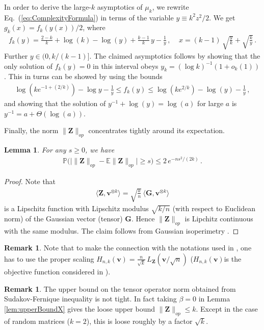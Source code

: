 \documentclass[11pt]{article}
\newtheorem{lemma}[claim]{Lemma}
\theoremstyle{definition}
\newtheorem{remark}[claim]{Remark}
\def\<{\langle}
\def\>{\rangle}
\def\prob{{\mathbb P}}
\def\E{{\mathbb E}} %
\def\bv{\mathbf{v}}
\def\bZ{\mathbf{Z}}
\def\bG{\mathbf{G}}
\def\E{\mathbb{E}}
\begin{document}
In order to derive the large-$k$ asymptotics of $\mu_k$, we
rewrite Eq.~(\ref{eq:ComplexityFormula}) in terms of the variable
$y\equiv k^2z^2/2$. We get $g_k(x) = f_k(y(x))/2$, where
%
\begin{align}
%
f_k(y) =\frac{2-k}{k} +\log(k)- \log (y)+ \frac{k-1}{k}\, y -
\frac{1}{y}\, ,\;\;\;\;
x =  (k-1) \, \sqrt{\frac{y}{k}}+\sqrt{\frac{k}{y}}\, .
%
\end{align}
%
Further $y \in (0, k/(k-1)]$.  The claimed asymptotics follows by
showing that the only solution of $f_k(y) = 0$ in this interval obeys
$y_k = (\log k)^{-1} (1+o_k(1))$. This in turns can be showed by using the
bounds
%
\begin{align}
%
\log(ke^{-1+(2/k)}) -\log y- \frac{1}{y} \le f_k(y) \le \log(ke^{2/k})
-\log(y) -\frac{1}{y}\, ,
%
\end{align}
%
and showing that the solution of $y^{-1}+\log(y) = \log(a)$ for large
$a$ is $y^{-1} = a +\Theta(\log(a))$.

Finally, the norm $\|\bZ\|_{op}$ concentrates tightly around its expectation.
\begin{lemma}
For any $s\ge 0$, we have
%
\begin{align}
%
\prob\big(\big|\|\bZ\|_{op}-\E\|\bZ\|_{op}\big|\ge s\big)\le 2\,
e^{-ns^2/(2k)}\, .
%
\end{align}
\end{lemma}
%
 \begin{proof}
Note that 
%
\begin{align}
%
\<\bZ,\bv^{\otimes k}\> = \sqrt{\frac{k}{n}}\, \<\bG,\bv^{\otimes k}\>
%
\end{align}
%
is a Lipschitz function with Lipschitz modulus $\sqrt{k/n}$ (with
respect to Euclidean norm) of the Gaussian  vector (tensor)
$\bG$. Hence $\|\bZ\|_{op}$ is Lipchitz continuous with the same
modulus. The claim follows from Gaussian isoperimetry \cite{Ledoux}.
 \end{proof}
%
 \begin{remark}
Note  that to make the connection with the notations used in
\cite{Auffinger13}, one has to use the proper scaling 
$H_{n,k}(\bv) = \frac n {\sqrt k} \, L_\bZ(\bv/\sqrt{n})$
($H_{n,k}(\bv)$is the objective function considered in \cite{Auffinger13}).
\end{remark}

\begin{remark}
The upper bound on the tensor operator norm obtained from
Sudakov-Fernique inequality is not tight. In fact taking $\beta = 0$
in Lemma \ref{lem:upperBoundX} gives the loose upper bound
$\|\bZ\|_{op}\leq k$. Except in the case of random matrices ($k=2$),
this is loose roughly by a factor $\sqrt{k}$.
\end{remark}
\end{document}

